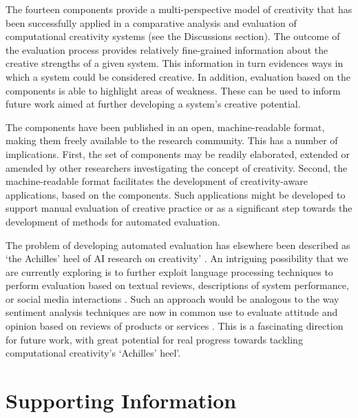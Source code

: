 \documentclass[10pt,letterpaper]{article}
\begin{document}
The fourteen components provide a multi-perspective model of creativity that has been successfully applied in a comparative analysis and evaluation of computational creativity systems \cite{jordanous12cc,jordanousphd,jordanous16aisb} (see the Discussions section). The outcome of the evaluation process provides relatively fine-grained information about the creative strengths of a given system. This information in turn evidences ways in which a system could be considered creative. In addition, evaluation based on the components is able to highlight areas of weakness. These can be used to inform future work aimed at further developing a system's creative potential.

The components have been published in an open, machine-readable format, making them freely available to the research community. This has a number of implications. First, the set of components may be readily elaborated, extended or amended by other researchers investigating the concept of creativity. Second, the machine-readable format facilitates the development of creativity-aware applications, based on the components. Such applications might be developed to support manual evaluation of creative practice or as a significant step towards the development of methods for automated evaluation.

The problem of developing automated evaluation has elsewhere been described as `the Achilles' heel of AI research on creativity' \cite{boden99}.  An intriguing possibility that we are currently exploring is to further exploit language processing techniques to perform evaluation based on textual reviews, descriptions of system performance, or social media interactions \cite{jordanous15vem}. Such an approach would be analogous to the way sentiment analysis techniques are now in common use to evaluate attitude and opinion based on reviews of products or services \cite{panglee08}. This is a fascinating direction for future work, with great potential for real progress towards tackling computational creativity's `Achilles' heel'.




\section*{Supporting Information}

\end{document}
